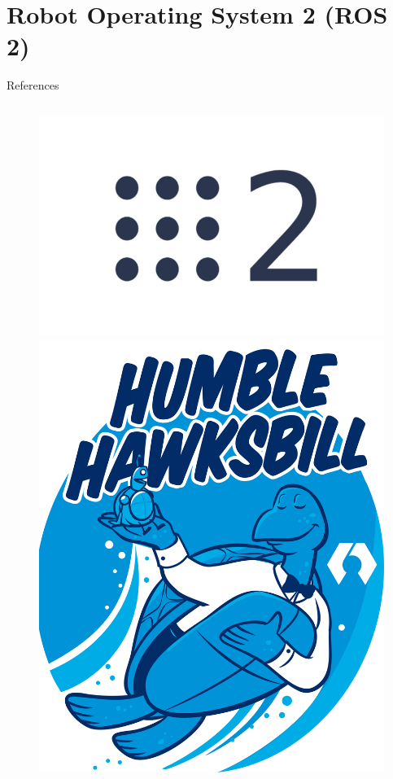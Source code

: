 \part{Robot Operating System 2 (ROS 2)}

\begin{frame}[plain]
    \author{Abel Carnicero\texorpdfstring{\\ \url{acarnm@unileon.es}}{}}
    \titlepage
\end{frame}

\begin{frame}{References}
    \begin{columns}[c]
        \begin{column}{.45\textwidth}
            \begin{figure}
                \centering
                \includegraphics[scale=0.15]{img/ros2/ros2_logo.jpeg}
                \includegraphics[scale=0.15]{img/ros2/ros2_humble.png}

\end{figure}
\end{column}
\end{columns}
\end{frame}
